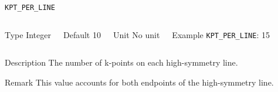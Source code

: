 \begin{frame}[allowframebreaks]{\texttt{KPT\_PER\_LINE}} \label{KPT_PER_LINE}
\vspace*{-12pt}
\begin{columns}
\begin{block}{Type}
Integer
\end{block}

\begin{block}{Default}
10
\end{block}

\begin{block}{Unit}
No unit
\end{block}

\begin{block}{Example}
\texttt{KPT\_PER\_LINE}: 15
\end{block}
\end{columns}

\begin{block}{Description}
The number of k-points on each high-symmetry line.
\end{block}

\begin{block}{Remark}
This value accounts for both endpoints of the high-symmetry line.
\end{block}

\end{frame}


